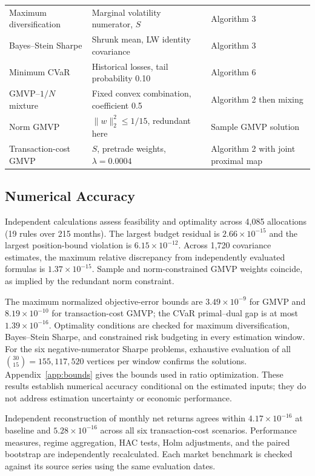 \documentclass[letterpaper,journal]{IEEEtran}
\begin{document}
\begin{table}[!tp]
\begin{tabular}{lll}
Maximum diversification & Marginal volatility numerator, $S$ & Algorithm 3\\
Bayes--Stein Sharpe & Shrunk mean, LW identity covariance & Algorithm 3\\
Minimum CVaR & Historical losses, tail probability 0.10 & Algorithm 6\\
GMVP--$1/N$ mixture & Fixed convex combination, coefficient 0.5 & Algorithm 2 then mixing\\
Norm GMVP & $\|w\|_2^2\leq1/15$, redundant here & Sample GMVP solution\\
Transaction-cost GMVP & $S$, pretrade weights, $\lambda=0.0004$ & Algorithm 2 with joint proximal map\\
\bottomrule\end{tabular}\end{table}
\subsection{Numerical Accuracy}
Independent calculations assess feasibility and optimality across 4,085 allocations (19 rules over 215 months). The largest budget residual is $2.66\times10^{-15}$ and the largest position-bound violation is $6.15\times10^{-12}$. Across 1,720 covariance estimates, the maximum relative discrepancy from independently evaluated formulas is $1.37\times10^{-15}$. Sample and norm-constrained GMVP weights coincide, as implied by the redundant norm constraint.

The maximum normalized objective-error bounds are $3.49\times10^{-9}$ for GMVP and $8.19\times10^{-10}$ for transaction-cost GMVP; the CVaR primal--dual gap is at most $1.39\times10^{-16}$. Optimality conditions are checked for maximum diversification, Bayes--Stein Sharpe, and constrained risk budgeting in every estimation window. For the six negative-numerator Sharpe problems, exhaustive evaluation of all $\binom{30}{15}=155{,}117{,}520$ vertices per window confirms the solutions. Appendix~\ref{app:bounds} gives the bounds used in ratio optimization. These results establish numerical accuracy conditional on the estimated inputs; they do not address estimation uncertainty or economic performance.

Independent reconstruction of monthly net returns agrees within $4.17\times10^{-16}$ at baseline and $5.28\times10^{-16}$ across all six transaction-cost scenarios. Performance measures, regime aggregation, HAC tests, Holm adjustments, and the paired bootstrap are independently recalculated. Each market benchmark is checked against its source series using the same evaluation dates.
\end{document}
